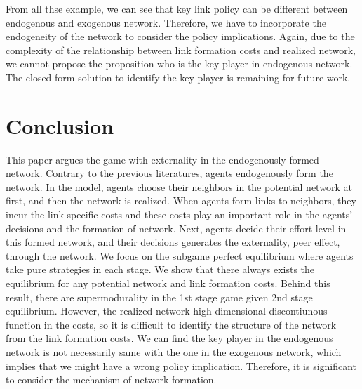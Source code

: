 \documentclass[12pt]{article}
\theoremstyle{definition}
\begin{document}
From all thse example, we can see that key link policy can be different between endogenous and exogenous network.
Therefore, we have to incorporate the endogeneity of the network to consider the policy implications.
Again, due to the complexity of the relationship between link formation costs and realized network, we cannot propose the proposition who is the key player in endogenous network.
The closed form solution to identify the key player is remaining for future work.


\section{Conclusion}

This paper argues the game with externality in the endogenously formed network.
Contrary to the previous literatures, agents endogenously form the network.
In the model, agents choose their neighbors in the potential network at first, and then the network is realized.
When agents form links to neighbors, they incur the link-specific costs and these costs play an important role in the agents' decisions and the formation of network.
Next, agents decide their effort level in this formed network, and their decisions generates the externality, peer effect, through the network.
We focus on the subgame perfect equilibrium where agents take pure strategies in each stage.
We show that there always exists the equilibrium for any potential network and link formation costs.
Behind this result, there are supermodurality in the 1st stage game given 2nd stage equilibrium.
However, the realized network high dimensional discontiunous function in the costs, so it is difficult to identify the structure of the network from the link formation costs.
We can find the key player in the endogenous network is not necessarily same with the one in the exogenous network, which implies that we might have a wrong policy implication.
Therefore, it is significant to consider the mechanism of network formation.
\end{document}
